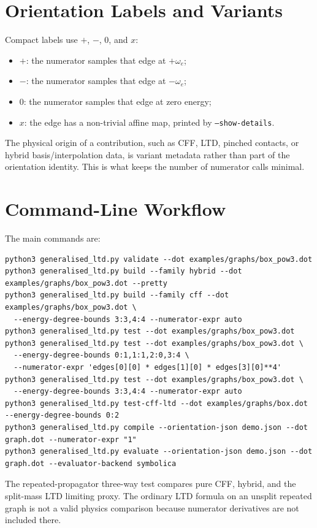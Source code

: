 \documentclass[11pt,a4paper]{report}
\begin{document}
\section{Orientation Labels and Variants}

Compact labels use \(+\), \(-\), \(0\), and \(x\):
\begin{itemize}[leftmargin=2em]
  \item \(+\): the numerator samples that edge at \(+\omega_e\);
  \item \(-\): the numerator samples that edge at \(-\omega_e\);
  \item \(0\): the numerator samples that edge at zero energy;
  \item \(x\): the edge has a non-trivial affine map, printed by
        \texttt{--show-details}.
\end{itemize}
The physical origin of a contribution, such as CFF, LTD, pinched contacts, or
hybrid basis/interpolation data, is variant metadata rather than part of the
orientation identity.  This is what keeps the number of numerator calls
minimal.

\section{Command-Line Workflow}

The main commands are:
\begin{lstlisting}
python3 generalised_ltd.py validate --dot examples/graphs/box_pow3.dot
python3 generalised_ltd.py build --family hybrid --dot examples/graphs/box_pow3.dot --pretty
python3 generalised_ltd.py build --family cff --dot examples/graphs/box_pow3.dot \
  --energy-degree-bounds 3:3,4:4 --numerator-expr auto
python3 generalised_ltd.py test --dot examples/graphs/box_pow3.dot
python3 generalised_ltd.py test --dot examples/graphs/box_pow3.dot \
  --energy-degree-bounds 0:1,1:1,2:0,3:4 \
  --numerator-expr 'edges[0][0] * edges[1][0] * edges[3][0]**4'
python3 generalised_ltd.py test --dot examples/graphs/box_pow3.dot \
  --energy-degree-bounds 3:3,4:4 --numerator-expr auto
python3 generalised_ltd.py test-cff-ltd --dot examples/graphs/box.dot --energy-degree-bounds 0:2
python3 generalised_ltd.py compile --orientation-json demo.json --dot graph.dot --numerator-expr "1"
python3 generalised_ltd.py evaluate --orientation-json demo.json --dot graph.dot --evaluator-backend symbolica
\end{lstlisting}
The repeated-propagator three-way test compares pure CFF, hybrid, and the
split-mass LTD limiting proxy.  The ordinary LTD formula on an unsplit repeated
graph is not a valid physics comparison because numerator derivatives are not
included there.
\end{document}
